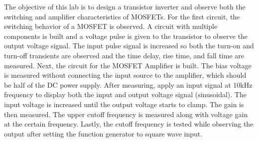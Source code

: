 The objective of this lab is to design a transistor inverter and observe both the switching and amplifier characteristics of MOSFETs. For the first circuit, the switching behavior of a MOSFET is observed. A circuit with multiple components is built and a voltage pulse is given to the transistor to observe the output voltage signal. The input pulse signal is increased so both the turn-on and turn-off transients are observed and the time delay, rise time, and fall time are measured. Next, the circuit for the MOSFET Amplifier is built. The bias voltage is measured without connecting the input source to the amplifier, which should be half of the DC power supply. After measuring, apply an input signal at 10kHz frequency to display both the input and output voltage signal (sinusoidal). The input voltage is increased until the output voltage starts to clamp. The gain is then measured. The upper cutoff frequency is measured along with voltage gain at the certain frequency. Lastly, the cutoff frequency is tested while observing the output after setting the function generator to square wave input. \\
